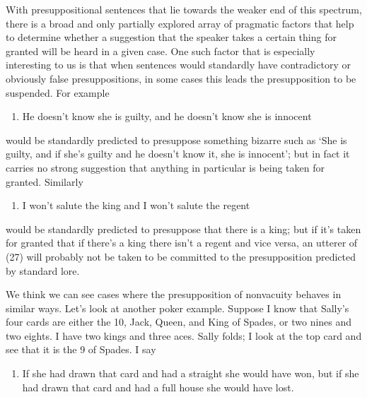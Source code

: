 With presuppositional sentences that lie towards the weaker end of this
spectrum, there is a broad and only partially explored array of
pragmatic factors that help to determine whether a suggestion that the
speaker takes a certain thing for granted will be heard in a given case.
One such factor that is especially interesting to us is that when
sentences would standardly have contradictory or obviously false
presuppositions, in some cases this leads the presupposition to be
suspended. For example

\begin{enumerate}
\def\labelenumi{(\arabic{enumi})}
\setcounter{enumi}{34}
\itemsep1pt\parskip0pt
\item
  He doesn't know she is guilty, and he doesn't know she is innocent
\end{enumerate}

would be standardly predicted to presuppose something bizarre such as
`She is guilty, and if she's guilty and he doesn't know it, she is
innocent'; but in fact it carries no strong suggestion that anything in
particular is being taken for granted. Similarly

\begin{enumerate}
\def\labelenumi{(\arabic{enumi})}
\setcounter{enumi}{35}
\itemsep1pt\parskip0pt
\item
  I won't salute the king and I won't salute the regent
\end{enumerate}

would be standardly predicted to presuppose that there is a king; but if
it's taken for granted that if there's a king there isn't a regent and
vice versa, an utterer of (27) will probably not be taken to be
committed to the presupposition predicted by standard lore.

We think we can see cases where the presupposition of nonvacuity behaves
in similar ways. Let's look at another poker example. Suppose I know
that Sally's four cards are either the 10, Jack, Queen, and King of
Spades, or two nines and two eights. I have two kings and three aces.
Sally folds; I look at the top card and see that it is the 9 of Spades.
I say

\begin{enumerate}
\def\labelenumi{(\arabic{enumi})}
\setcounter{enumi}{36}
\itemsep1pt\parskip0pt
\item
  If she had drawn that card and had a straight she would have won, but
  if she had drawn that card and had a full house she would have lost.
\end{enumerate}

